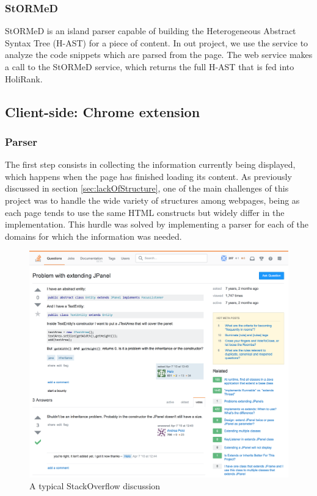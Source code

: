\subsubsection{StORMeD}
StORMeD\cite{Ponz2015a} is an island parser capable of building the Heterogeneous Abstract Syntax Tree (H-AST) for a piece of content. In out project, we use the service to analyze the code snippets which are parsed from the page. The web service makes a call to the StORMeD service, which returns the full H-AST that is fed into HoliRank.

\subsection{Client-side: Chrome extension}
\subsubsection{Parser}
The first step consists in collecting the information currently being displayed, which happens when the page has finished loading its content. As previously discussed in section \ref{sec:lackOfStructure}, one of the main challenges of this project was to handle the wide variety of structures among webpages, being as each page tends to use the same HTML constructs but widely differ in the implementation. This hurdle was solved by implementing a parser for each of the domains for which the information was needed. 

\begin{figure}[H]
\centering
\includegraphics[scale=0.3]{Figures/SOConv}
\caption{A typical StackOverflow discussion}
\label{fig:soConv}
\end{figure}

